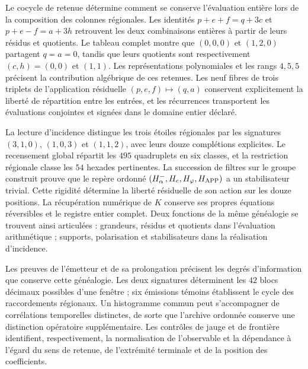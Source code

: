 Le cocycle de retenue détermine comment se conserve l'évaluation entière
lors de la composition des colonnes régionales. Les identités
\(p+e+f=q+3c\) et \(p+e-f=a+3h\) retrouvent les deux combinaisons
entières à partir de leurs résidus et quotients. Le tableau complet montre
que \((0,0,0)\) et \((1,2,0)\) partagent \(q=a=0\), tandis que leurs
quotients sont respectivement \((c,h)=(0,0)\) et \((1,1)\).
Les représentations polynomiales et les rangs \(4,5,5\) précisent
la contribution algébrique de ces retenues. Les neuf fibres de trois
triplets de l'application résiduelle \((p,e,f)\mapsto(q,a)\) conservent explicitement
la liberté de répartition entre les entrées, et les récurrences
transportent les évaluations conjointes et signées dans le domaine
entier déclaré.

La lecture d'incidence distingue les trois étoiles régionales par les signatures \((3,1,0)\), \((1,0,3)\) et \((1,1,2)\), avec leurs douze complétions explicites. Le recensement global répartit les \(495\) quadruplets en six classes, et la restriction régionale classe les \(54\) hexades pertinentes. La succession de filtres sur le groupe construit prouve que le repère ordonné \((H^-_\alpha,H_e,H_\varphi,H_{\rm APP})\) a un stabilisateur trivial. Cette rigidité détermine la liberté résiduelle de son action sur les douze positions. La récupération numérique de \(K\) conserve ses propres équations réversibles et le registre entier complet. Deux fonctions de la même généalogie se trouvent ainsi articulées : grandeurs, résidus et quotients dans l'évaluation arithmétique ; supports, polarisation et stabilisateurs dans la réalisation d'incidence.


Les preuves de l'émetteur et de sa prolongation précisent les degrés
d'information que conserve cette généalogie. Les deux signatures déterminent les
\(42\) blocs décimaux possibles d'une fenêtre ; six émissions témoins
établissent le cycle des raccordements régionaux. Un histogramme commun peut
s'accompagner de corrélations temporelles distinctes, de sorte que l'archive
ordonnée conserve une distinction opératoire supplémentaire. Les contrôles de
jauge et de frontière identifient, respectivement, la normalisation de
l'observable et la dépendance à l'égard du sens de retenue, de l'extrémité
terminale et de la position des coefficients.

